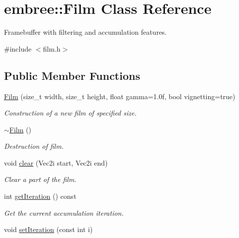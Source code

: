 \hypertarget{classembree_1_1_film}{
\section{embree::Film Class Reference}
\label{classembree_1_1_film}
}


Framebuffer with filtering and accumulation features.  




{\ttfamily \#include $<$film.h$>$}

\subsection*{Public Member Functions}
\begin{DoxyCompactItemize}
\item 
\hyperlink{classembree_1_1_film_ac76a9b540d10b69d2d82c94b745e196e}{Film} (size\_\-t width, size\_\-t height, float gamma=1.0f, bool vignetting=true)
\begin{DoxyCompactList}\small\item\em Construction of a new film of specified size. \item\end{DoxyCompactList}\item 
\hyperlink{classembree_1_1_film_a2865cd4fdc84fe321ec0200150d0860f}{$\sim$Film} ()
\begin{DoxyCompactList}\small\item\em Destruction of film. \item\end{DoxyCompactList}\item 
void \hyperlink{classembree_1_1_film_a06f4760c53434d7a8575befebf57c947}{clear} (Vec2i start, Vec2i end)
\begin{DoxyCompactList}\small\item\em Clear a part of the film. \item\end{DoxyCompactList}\item 
int \hyperlink{classembree_1_1_film_af6f9dcfb2b727a8dcb967e1b8b250ca4}{getIteration} () const 
\begin{DoxyCompactList}\small\item\em Get the current accumulation iteration. \item\end{DoxyCompactList}\item 
void \hyperlink{classembree_1_1_film_af8438f0f2b2598796249482a8e3bd82f}{setIteration} (const int i)

\end{DoxyCompactItemize}
